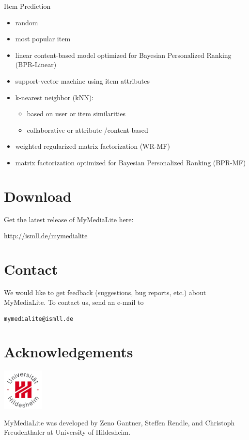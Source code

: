 \documentclass[a4paper, foldmark, 12pt]{leaflet}
\begin{document}
Item Prediction
\begin{itemize}
	\item random
	\item most popular item
	\item linear content-based model optimized for Bayesian Personalized Ranking (BPR-Linear)
	\item support-vector machine using item attributes
	\item k-nearest neighbor (kNN):
		\begin{itemize}
			\item based on user or item similarities
			\item collaborative or attribute-/content-based
		\end{itemize}
	\item weighted regularized matrix factorization (WR-MF)
	\item matrix factorization optimized for Bayesian Personalized Ranking (BPR-MF)
\end{itemize}

\newpage

\section{Download}
Get the latest release of MyMediaLite here:
\begin{center}
	\url{http://ismll.de/mymedialite}
\end{center}

\section{Contact}
We would like to get feedback (suggestions, bug reports, etc.) about MyMediaLite.
To contact us, send an e-mail to
\begin{center}
	\texttt{mymedialite@ismll.de}
\end{center}

\section{Acknowledgements}

\begin{floatingfigure}[r]{1.6cm}
	\vspace{-0.5cm}
	\includegraphics[width=2.1cm]{fig/uni-hildesheim-400x400.jpg}
\end{floatingfigure}
MyMediaLite was developed by Zeno Gantner,
Steffen Rendle, and Christoph Freudenthaler
at University of Hildesheim.
	
\end{document}
